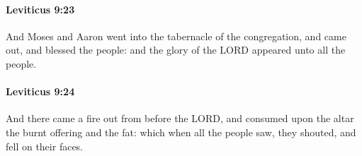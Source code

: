 		\paragraph{Leviticus 9:23} %
			\label{LEVITICUS-9-23}

			And Moses and Aaron went into the tabernacle of the congregation, and came out, and blessed the people: and the glory of the LORD appeared unto all the people.


		\paragraph{Leviticus 9:24} %
			\label{LEVITICUS-9-24}

			And there came a fire out from before the LORD, and consumed upon the altar the burnt offering and the fat: which when all the people saw, they shouted, and fell on their faces.

